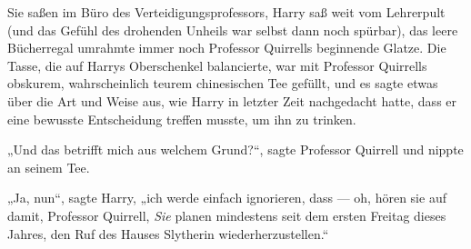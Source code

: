 Sie saßen im Büro des Verteidigungsprofessors, Harry saß weit vom Lehrerpult (und das Gefühl des drohenden Unheils war selbst dann noch spürbar), das leere Bücherregal umrahmte immer noch Professor Quirrells beginnende Glatze. Die Tasse, die auf Harrys Oberschenkel balancierte, war mit Professor Quirrells obskurem, wahrscheinlich teurem chinesischen Tee gefüllt, und es sagte etwas über die Art und Weise aus, wie Harry in letzter Zeit nachgedacht hatte, dass er eine bewusste Entscheidung treffen musste, um ihn zu trinken.

„Und das betrifft mich aus welchem Grund?“, sagte Professor Quirrell und nippte an seinem Tee.

„Ja, nun“, sagte Harry, „ich werde einfach ignorieren, dass — oh, hören sie auf damit, Professor Quirrell, \emph{Sie} planen mindestens seit dem ersten Freitag dieses Jahres, den Ruf des Hauses Slytherin wiederherzustellen.“

